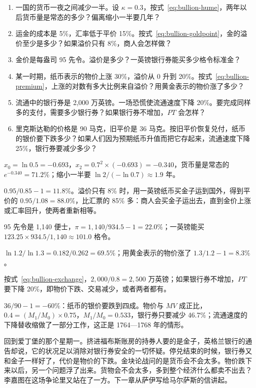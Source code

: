 \begin{selfcheck}
\begin{enumerate}
\item 一国的货币一夜之间减少一半。设 $\kappa=0.3$，按式~\eqref{eq:bullion-hume}，两年以后货币量是常态的多少？偏离缩小一半要几年？
\item 运金的成本是 5\%，汇率低于平价 15\%。按式~\eqref{eq:bullion-goldpoint}，金的溢价至少是多少？如果溢价只有 8\%，商人会怎样做？
\item 金价是每盎司 95 先令。溢价是多少？一英镑银行券能买多少格令标准金？
\item 某一时期，纸币表示的物价上涨 30\%，溢价从 0 升到 20\%。按式~\eqref{eq:bullion-premium}，上涨的对数有多大比例来自溢价？用黄金表示的物价涨了多少？
\item 流通中的银行券是 2,000 万英镑。一场恐慌使流通速度下降 20\%。要完成同样多的支付，需要多少银行券？如果银行券不增加，$PT$ 会怎样？
\item 里克斯达勒的价格是 90 马克，旧平价是 36 马克。按旧平价恢复兑付，纸币的银价要下跌多少？如果人们因为预期纸币升值而把它存起来，流通速度下降 25\%，银行券要减少多少？
\end{enumerate}
\end{selfcheck}

\begin{answers}
\item $x_{0}=\ln0.5=-0.693$，$x_{2}=0.7^{2}\times(-0.693)=-0.340$，货币量是常态的 $e^{-0.340}=71.2\%$；缩小一半要 $\ln2/(-\ln0.7)\approx1.9$ 年。
\item $0.95/0.85-1=11.8\%$。溢价只有 8\% 时，用一英镑纸币买金子运到国外，得到平价的 $0.95/1.08=88.0\%$，比汇票的 85\% 多：商人会买金子运出去，直到金价上涨或汇率回升，使两者重新相等。
\item 95 先令是 1,140 便士，$\pi=1{,}140/934.5-1=22.0\%$；一英镑能买 $123.25\times934.5/1{,}140\approx101.0$ 格令。
\item $\ln1.2/\ln1.3=0.182/0.262=69.5\%$；用黄金表示的物价涨了 $1.3/1.2-1=8.3\%$。
\item 按式~\eqref{eq:bullion-exchange}，$2{,}000/0.8=2{,}500$ 万英镑；如果银行券不增加，$PT$ 要下降 20\%，即物价下跌、交易减少，或者两者都有。
\item $36/90-1=-60\%$：纸币的银价要跌到四成。物价与 $MV$ 成正比，$0.4=(M_{1}/M_{0})\times0.75$，$M_{1}/M_{0}=0.533$，银行券只要减少 46.7\%；流通速度的下降替收缩做了一部分工作，这正是 1764—1768 年的情形。
\end{answers}

回到爱丁堡的那个星期一。挤进福布斯账房的持券人要的是金子，英格兰银行的通告却说，它的状况足以消除对银行券安全的一切怀疑。停兑结束的时候，银行券又和金子一样好了，代价是物价的下跌。金块论战问的是货币会不会太多。物价跌下来以后，另一个问题浮了出来。货物会不会太多，多到整个经济什么都卖不出去？李嘉图在这场争论里又站在了一方。下一章从萨伊写给马尔萨斯的信讲起。
